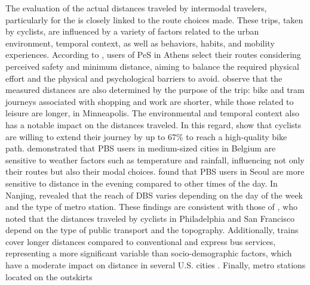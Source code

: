 \begin{refsegment}
The evaluation of the actual distances traveled by intermodal travelers, particularly for the  is closely linked to the route choices made. These trips, taken by cyclists, are influenced by a variety of factors related to the urban environment, temporal context, as well as behaviors, habits, and mobility experiences. According to \textcolor{blue}{\textcite[15]{tzouras_describing_2023}}, users of \acrshort{PeS} in Athens select their routes considering perceived safety and minimum distance, aiming to balance the required physical effort and the physical and psychological barriers to avoid. \textcolor{blue}{\textcite[621]{krizek_detailed_2007}} observe that the measured distances are also determined by the purpose of the trip: bike and tram journeys associated with shopping and work are shorter, while those related to leisure are longer, in Minneapolis. The environmental and temporal context also has a notable impact on the distances traveled. In this regard, \textcolor{blue}{\textcite[619]{krizek_detailed_2007}} show that cyclists are willing to extend their journey by up to 67\% to reach a high-quality bike path. \textcolor{blue}{\textcite[8]{adnan_last-mile_2019}} demonstrated that \acrshort{PBS} users in medium-sized cities in Belgium are sensitive to weather factors such as temperature and rainfall, influencing not only their routes but also their modal choices. \textcolor{blue}{\textcite[3110]{cho_estimation_2022}} found that \acrshort{PBS} users in Seoul are more sensitive to distance in the evening compared to other times of the day. In Nanjing, \textcolor{blue}{\textcite[11]{li_operating_2019}} revealed that the reach of \acrshort{DBS} varies depending on the day of the week and the type of metro station. These findings are consistent with those of \textcolor{blue}{\textcite[105]{flamm_public_2014}}, who noted that the distances traveled by cyclists in Philadelphia and San Francisco depend on the type of public transport and the topography. Additionally, trains cover longer distances compared to conventional and express bus services, representing a more significant variable than socio-demographic factors, which have a moderate impact on distance in several U.S. cities \textcolor{blue}{\autocite[23-24]{hochmair_assessment_2015}}. Finally, metro stations located on the outskirts 
\end{refsegment}

